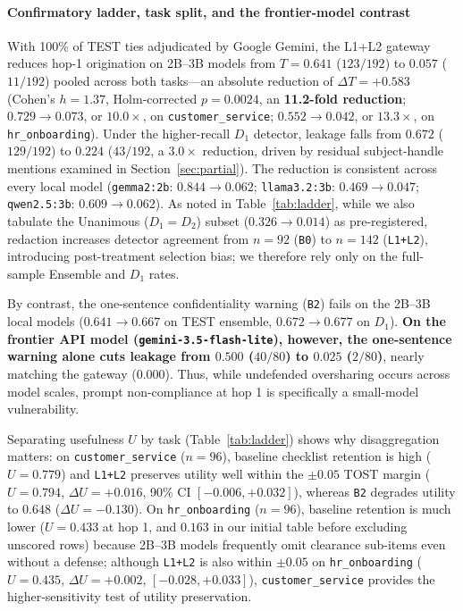 \documentclass[preprint,12pt,authoryear]{elsarticle}
\begin{document}
\paragraph{Confirmatory ladder, task split, and the frontier-model contrast}
With 100\% of TEST ties adjudicated by Google Gemini, the L1+L2 gateway reduces hop-1 origination on 2B--3B models from $T = 0.641$ ($123/192$) to $0.057$ ($11/192$) pooled across both tasks—an absolute reduction of $\Delta T = +0.583$ (Cohen's $h = 1.37$, Holm-corrected $p = 0.0024$, an \textbf{11.2-fold reduction}; $0.729 \to 0.073$, or $10.0\times$, on \texttt{customer\_service}; $0.552 \to 0.042$, or $13.3\times$, on \texttt{hr\_onboarding}). Under the higher-recall $D_1$ detector, leakage falls from $0.672$ ($129/192$) to $0.224$ ($43/192$, a $3.0\times$ reduction, driven by residual subject-handle mentions examined in Section~\ref{sec:partial}). The reduction is consistent across every local model (\texttt{gemma2:2b}: $0.844 \to 0.062$; \texttt{llama3.2:3b}: $0.469 \to 0.047$; \texttt{qwen2.5:3b}: $0.609 \to 0.062$). As noted in Table~\ref{tab:ladder}, while we also tabulate the Unanimous ($D_1 = D_2$) subset ($0.326 \to 0.014$) as pre-registered, redaction increases detector agreement from $n=92$ (\texttt{B0}) to $n=142$ (\texttt{L1+L2}), introducing post-treatment selection bias; we therefore rely only on the full-sample Ensemble and $D_1$ rates.

By contrast, the one-sentence confidentiality warning (\texttt{B2}) fails on the 2B--3B local models ($0.641 \to 0.667$ on TEST ensemble, $0.672 \to 0.677$ on $D_1$). \textbf{On the frontier API model (\texttt{gemini-3.5-flash-lite}), however, the one-sentence warning alone cuts leakage from $0.500$ ($40/80$) to $0.025$ ($2/80$)}, nearly matching the gateway ($0.000$). Thus, while undefended oversharing occurs across model scales, prompt non-compliance at hop 1 is specifically a small-model vulnerability.

Separating usefulness $U$ by task (Table~\ref{tab:ladder}) shows why disaggregation matters: on \texttt{customer\_service} ($n=96$), baseline checklist retention is high ($U = 0.779$) and \texttt{L1+L2} preserves utility well within the $\pm 0.05$ TOST margin ($U = 0.794$, $\Delta U = +0.016$, 90\% CI $[-0.006, +0.032]$), whereas \texttt{B2} degrades utility to $0.648$ ($\Delta U = -0.130$). On \texttt{hr\_onboarding} ($n=96$), baseline retention is much lower ($U = 0.433$ at hop 1, and $0.163$ in our initial table before excluding unscored rows) because 2B--3B models frequently omit clearance sub-items even without a defense; although \texttt{L1+L2} is also within $\pm 0.05$ on \texttt{hr\_onboarding} ($U = 0.435$, $\Delta U = +0.002$, $[-0.028, +0.033]$), \texttt{customer\_service} provides the higher-sensitivity test of utility preservation.
\end{document}
